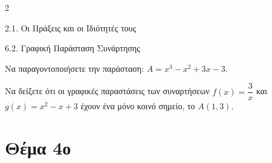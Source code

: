 \begin{ylh}{2}
    \item 2.1. Οι Πράξεις και οι Ιδιότητές τους
    \item 6.2. Γραφική Παράσταση Συνάρτησης
\end{ylh}

\begin{alist}
\item Να παραγοντοποιήσετε την παράσταση: $A = x^{3} - x^{2} + 3x - 3.$
\item Να δείξετε ότι οι γραφικές παραστάσεις των συναρτήσεων $f(x) = \dfrac{3}{x}$ και $g(x) = x^{2} - x + 3$ έχουν ένα μόνο κοινό σημείο, το $A(1,3).$
\end{alist}


\newpage
\section{Θέμα 4ο}


